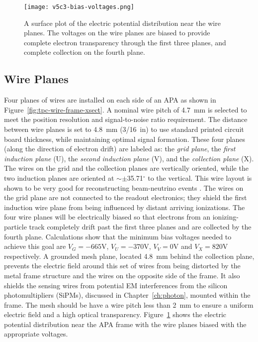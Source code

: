 \begin{figure}[htbp]
\centering
\texttt{[image: v5c3-bias-voltages.png]}
\caption[Plot of electric potential distribution near the wire planes]{A surface plot of the electric potential distribution near the wire planes.  The voltages on the wire planes are biased to provide complete electron transparency through the first three planes, and complete collection on the fourth plane. }
\label{fig:tpc-bias-voltages}
\end{figure}

\subsection{Wire Planes}


Four planes of wires are installed on each side of an APA as shown in Figure~\ref{fig:tpc-wire-frame-xsect}.
A nominal wire pitch of 4.7~mm is selected to meet the position resolution  and signal-to-noise ratio requirement. The distance between wire planes is set to 4.8~mm (3/16~in) to use standard printed circuit board thickness, while maintaining optimal signal formation.  These four planes (along the direction of electron drift) are labeled as: the {\em grid plane}, the {\em first induction plane} (U), the {\em second induction plane} (V), and the {\em collection plane} (X).
The wires on the grid and the collection planes
are vertically oriented, while the two induction planes are oriented 
at $\sim\pm$35.71$^\circ$ to the vertical. This wire layout is shown to be very good for reconstructing beam-neutrino events \cite{wire-orientation}. The wires on the grid plane are not 
connected to the readout electronics; they shield the first induction wire plane from being influenced by distant arriving ionizations. The four wire planes 
will be electrically biased so that electrons from an ionizing-particle
track completely drift past the first three planes and are collected by the 
fourth plane. Calculations show that the minimum bias voltages 
needed to achieve this goal are $V_G= -665$V, $V_U=-370$V, $V_V=0$V and $V_X=820$V 
respectively.  A grounded mesh plane, located 4.8~mm behind the collection plane, prevents the electric field around this set of wires from being distorted by the metal frame structure and the wires on the opposite side of the frame. It also shields the sensing wires from potential EM interferences from the silicon photomultipliers (SiPMs), discussed in Chapter~\ref{ch:photon}, mounted within the frame.  The mesh should be have a wire pitch less than 2~mm to ensure a uniform electric field and a high optical transparency.  Figure~\ref{fig:tpc-bias-voltages} shows the electric potential distribution near the APA frame with the wire planes biased with the appropriate voltages. 

